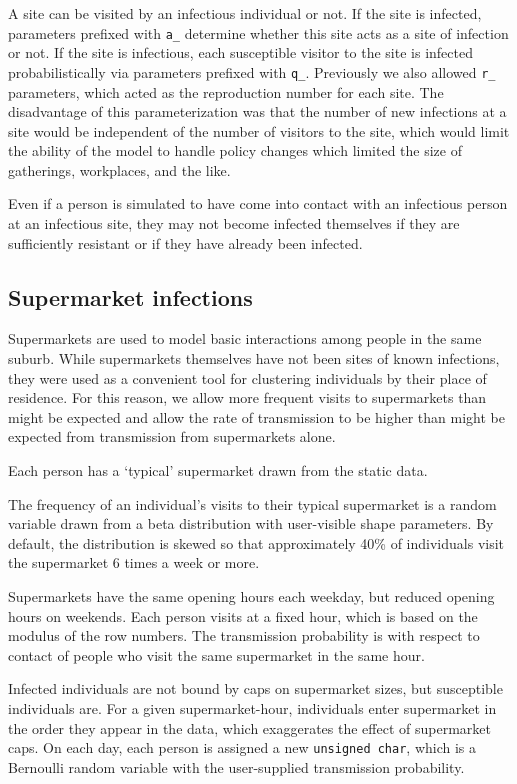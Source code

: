 \documentclass[submission]{grattan}
\newcommand*{\code}[1]{\texttt{#1}}
\begin{document}
A site can be visited by an infectious
individual or not.
If the site is infected, parameters prefixed with \code{a\_} determine
whether this site acts as a site of infection or not. If the site is infectious,
each susceptible visitor to the site is infected probabilistically
via parameters prefixed with \code{q\_}.
Previously we also allowed \code{r\_} parameters, which acted as the reproduction number for
each site. The disadvantage of this parameterization was that the number of new
infections at a site would be independent of the number of visitors to the site, which would limit
the ability of the model to handle policy changes which limited the size of gatherings, workplaces,
and the like.

Even if a person is simulated to have come into contact with an infectious person at an infectious 
site, they may not become infected themselves if they are sufficiently resistant or if they have 
already been infected.


\subsection{Supermarket infections}

Supermarkets are used to model basic interactions among people in the same suburb. While 
supermarkets themselves have not been sites of known infections, they were used as a convenient
tool for clustering individuals by their place of residence. For this reason, we allow more
frequent visits to supermarkets than might be expected and allow the rate of transmission to be 
higher than might be expected from transmission from supermarkets alone.

Each person has a `typical' supermarket drawn from the static data.

The frequency of an individual's visits to their typical supermarket is a random variable
drawn from a beta distribution with user-visible shape parameters. By default, the distribution
is skewed so that approximately 40\% of individuals visit the supermarket 6 times a week or
more.

Supermarkets have the same opening hours each weekday, but reduced opening hours on weekends.
Each person visits at a fixed hour, which is based on the modulus of the row numbers. The transmission
probability is with respect to contact of people who visit the same supermarket in the same hour.

Infected individuals are not bound by caps on supermarket sizes, but susceptible individuals are.
For a given supermarket-hour, individuals enter supermarket in the order they appear in the data,
which exaggerates the effect of supermarket caps. On each day, each person is assigned a
new \code{unsigned char}, which is a Bernoulli random variable with the user-supplied
transmission probability.
\end{document}

